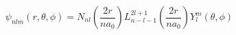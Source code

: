 \documentclass[border=2pt,varwidth]{standalone}
\begin{document}
\[
  \psi_{nlm}(r,\theta,\phi) =
  N_{nl} \left ( \frac{2 r}{n a_0} \right )
  L_{n-l-1}^{2l+1} \left ( \frac{2 r}{n a_0} \right )
  Y_l^m(\theta,\phi)
\]
\end{document}
